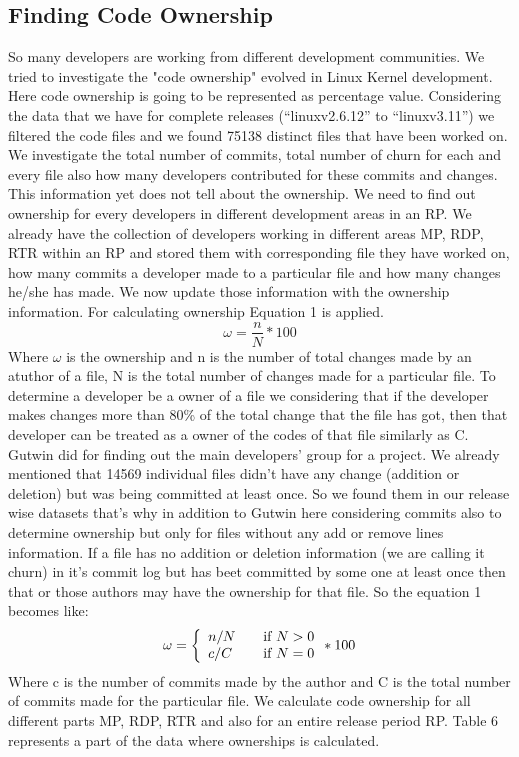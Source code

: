 \documentclass{acm_proc_article-sp}
\begin{document}
\subsection{Finding Code Ownership}
So many developers are working from different development communities. We tried to investigate the "code ownership" \cite{mockus_case_study} evolved in Linux Kernel development. Here code ownership is going to be represented as percentage value. Considering the data that we have for complete releases (``linuxv2.6.12'' to ``linuxv3.11'') we filtered the code files and we found 75138 distinct files that have been worked on. We investigate the total number of commits, total number of churn for each and every file also how many developers contributed for these commits and changes. This information yet does not tell about the ownership. We need to find out ownership for every developers in different development areas in an RP. We already have the collection of developers working in different areas MP, RDP, RTR within an RP and stored them with corresponding file they have worked on, how many commits a developer made to a particular file and how many changes he/she has made. We now update those information with the ownership information. For calculating ownership Equation 1 is applied.
\begin{equation}\omega=\frac{n}{N}*100\end{equation}
Where $\omega$ is the ownership and n is the number of total changes made by an atuthor of a file, N is the total number of changes made for a particular file.
To determine a developer be a owner of a file we considering that if the developer makes changes more than 80\% of the total change that the file has got, then that developer can be treated as a owner of the codes of that file similarly as C. Gutwin did \cite{gutwin_awareness} for finding out the main developers' group for a project. We already mentioned that 14569 individual files didn't have any change (addition or deletion) but was being committed at least once. So we found them in our release wise datasets that's why in addition to Gutwin here considering commits also to determine ownership but only for files without any add or remove lines information. If a file has no addition or deletion information (we are calling it churn) in it's commit log but has beet committed by some one at least once then that or those authors may have the ownership for that file. So the equation 1 becomes like:
\begin{equation} \omega = \left\{ \begin{array}{l l} n/N & \quad \text{if $N > 0$}\\ c/C & \quad \text{if $N = 0$} \end{array} * 100 \right.\end{equation}
Where c is the number of commits made by the author and C is the total number of commits made for the particular file.
We calculate code ownership for all different parts MP, RDP, RTR and also for an entire release period RP. Table 6 represents a part of the data where ownerships is calculated.
\end{document}
